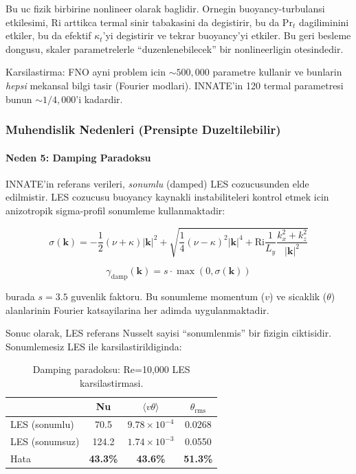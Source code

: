 Bu uc fizik birbirine nonlineer olarak baglidir. Ornegin buoyancy-turbulansi
etkilesimi, $\text{Ri}$ arttikca termal sinir tabakasini da degistirir,
bu da $\text{Pr}_t$ dagiliminini etkiler, bu da efektif $\kappa_t$'yi
degistirir ve tekrar buoyancy'yi etkiler. Bu geri besleme dongusu, skaler
parametrelerle ``duzenlenebilecek'' bir nonlineerligin otesindedir.

Karsilastirma: FNO \cite{li2021fno} ayni problem icin $\sim 500{,}000$
parametre kullanir ve bunlarin \emph{hepsi} mekansal bilgi tasir (Fourier
modlari). INNATE'in 120 termal parametresi bunun $\sim 1/4{,}000$'i kadardir.


\subsubsection{Muhendislik Nedenleri (Prensipte Duzeltilebilir)}
\label{sec:engineering-causes}

\paragraph{Neden 5: Damping Paradoksu}
\label{sec:damping-paradox}

INNATE'in referans verileri, \emph{sonumlu} (damped) LES cozucusunden
elde edilmistir. LES cozucusu buoyancy kaynakli instabiliteleri kontrol
etmek icin anizotropik sigma-profil sonumleme kullanmaktadir:

\begin{equation}
  \sigma(\mathbf{k}) = -\frac{1}{2}(\nu + \kappa)|\mathbf{k}|^2
  + \sqrt{\frac{1}{4}(\nu - \kappa)^2|\mathbf{k}|^4
  + \text{Ri}\frac{1}{L_y}\frac{k_x^2 + k_z^2}{|\mathbf{k}|^2}}
  \label{eq:growth-rate}
\end{equation}

\begin{equation}
  \gamma_\text{damp}(\mathbf{k}) = s \cdot \max(0, \sigma(\mathbf{k}))
  \label{eq:damping-profile}
\end{equation}

\noindent burada $s = 3.5$ guvenlik faktoru. Bu sonumleme momentum ($v$)
ve sicaklik ($\theta$) alanlarinin Fourier katsayilarina her adimda
uygulanmaktadir.

Sonuc olarak, LES referans Nusselt sayisi ``sonumlenmis'' bir fizigin
ciktisidir. Sonumlemesiz LES ile karsilastirildiginda:

\begin{table}[H]
  \centering
  \caption{Damping paradoksu: Re=10{,}000 LES karsilastirmasi.}
  \label{tab:damping-paradox}
  \begin{tabular}{lccc}
    \toprule
    & Nu & $\langle v\theta \rangle$ & $\theta_\text{rms}$ \\
    \midrule
    LES (sonumlu)       & 70.5   & $9.78 \times 10^{-4}$ & 0.0268 \\
    LES (sonumsuz)      & 124.2  & $1.74 \times 10^{-3}$ & 0.0550 \\
    Hata                 & \textbf{43.3\%} & \textbf{43.6\%} & \textbf{51.3\%} \\
    \bottomrule
  \end{tabular}
\end{table}

